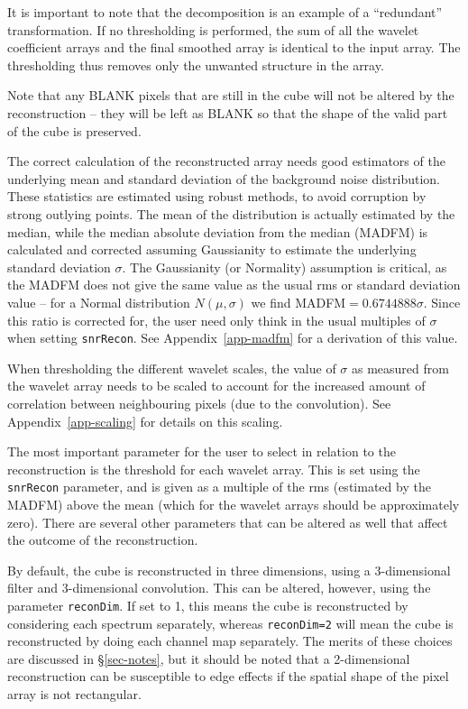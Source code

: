 It is important to note that the \atrous decomposition is an example
of a ``redundant'' transformation. If no thresholding is performed,
the sum of all the wavelet coefficient arrays and the final smoothed
array is identical to the input array. The thresholding thus removes
only the unwanted structure in the array.

Note that any BLANK pixels that are still in the cube will not be
altered by the reconstruction -- they will be left as BLANK so that
the shape of the valid part of the cube is preserved.


The correct calculation of the reconstructed array needs good
estimators of the underlying mean and standard deviation of the
background noise distribution. These statistics are estimated using
robust methods, to avoid corruption by strong outlying points. The
mean of the distribution is actually estimated by the median, while
the median absolute deviation from the median (MADFM) is calculated
and corrected assuming Gaussianity to estimate the underlying standard
deviation $\sigma$. The Gaussianity (or Normality) assumption is
critical, as the MADFM does not give the same value as the usual rms
or standard deviation value -- for a Normal distribution
$N(\mu,\sigma)$ we find MADFM$=0.6744888\sigma$. Since this ratio is
corrected for, the user need only think in the usual multiples of
$\sigma$ when setting \texttt{snrRecon}. See Appendix~\ref{app-madfm}
for a derivation of this value.

When thresholding the different wavelet scales, the value of $\sigma$
as measured from the wavelet array needs to be scaled to account for
the increased amount of correlation between neighbouring pixels (due
to the convolution). See Appendix~\ref{app-scaling} for details on
this scaling.


The most important parameter for the user to select in relation to the
reconstruction is the threshold for each wavelet array. This is set
using the \texttt{snrRecon} parameter, and is given as a multiple of
the rms (estimated by the MADFM) above the mean (which for the wavelet
arrays should be approximately zero). There are several other
parameters that can be altered as well that affect the outcome of the
reconstruction.

By default, the cube is reconstructed in three dimensions, using a
3-dimensional filter and 3-dimensional convolution. This can be
altered, however, using the parameter \texttt{reconDim}. If set to 1,
this means the cube is reconstructed by considering each spectrum
separately, whereas \texttt{reconDim=2} will mean the cube is
reconstructed by doing each channel map separately. The merits of
these choices are discussed in \S\ref{sec-notes}, but it should be
noted that a 2-dimensional reconstruction can be susceptible to edge
effects if the spatial shape of the pixel array is not rectangular.

